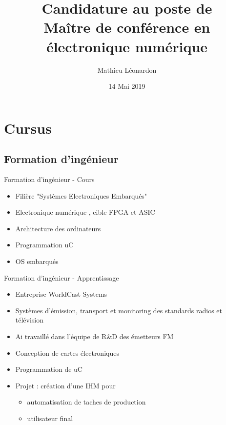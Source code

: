 \documentclass[t,compress,mathserif,12pt,xcolor=dvipsnames]{beamer}
\title{\textbf{Candidature au poste de \\ Maître de conférence en électronique numérique}}
\author[Mathieu Léonardon\hspace{3.01cm}\url{https://mathieuleonardon.com}\hspace{1.0cm}{mathieu.leonardon@ims-bordeaux.fr}]{\Large{Mathieu Léonardon}\vspace{-0.5cm}}
\date{14 Mai 2019}
\begin{document}
\begin{frame}[c]
\titlepage
\end{frame}

\section{Cursus}
\subsection{Formation d'ingénieur}
\begin{frame}[c]{Formation d'ingénieur - Cours}
  \begin{itemize}
    \item Filière "Systèmes Electroniques Embarqués"
    \item Electronique numérique , cible FPGA et ASIC
    \item Architecture des ordinateurs
    \item Programmation uC
    \item OS embarqués
  \end{itemize}
\end{frame}
\begin{frame}[c]{Formation d'ingénieur - Apprentissage}
  \begin{itemize}
  \item Entreprise WorldCast Systems
  \item Systèmes d'émission, transport et monitoring des standards radios et télévision
  \item Ai travaillé dans l'équipe de R\&D des émetteurs FM
  \item Conception de cartes électroniques
  \item Programmation de uC 
  \item Projet : création d'une IHM pour
    \begin{itemize}
      \item automatisation de taches de production
      \item utilisateur final
    \end{itemize}
  \end{itemize}

\end{frame}
\end{document}
